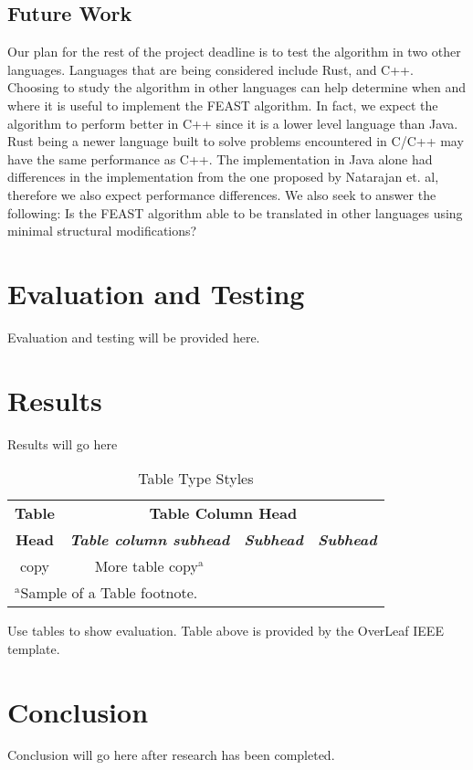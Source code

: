 \documentclass[conference]{IEEEtran}
\begin{document}
\subsection{Future Work}\label{AA}
Our plan for the rest of the project deadline is to test the algorithm in two other languages. Languages that are being considered include Rust, and C++. Choosing to study the algorithm in other languages can help determine when and where it is useful to implement the FEAST algorithm. In fact, we expect the algorithm to perform better in C++ since it is a lower level language than Java. Rust being a newer language built to solve problems encountered in C/C++ may have the same performance as C++. The implementation in Java alone had differences in the implementation from the one proposed by Natarajan et. al, therefore we also expect performance differences. We also seek to answer the following: Is the FEAST algorithm able to be translated in other languages using minimal structural modifications? 

\section{Evaluation and Testing}
Evaluation and testing will be provided here.

\section{Results}
Results will go here

\begin{table}[htbp]
\caption{Table Type Styles}
\begin{center}
\begin{tabular}{|c|c|c|c|}
\hline
\textbf{Table}&\multicolumn{3}{|c|}{\textbf{Table Column Head}} \\
\cline{2-4} 
\textbf{Head} & \textbf{\textit{Table column subhead}}& \textbf{\textit{Subhead}}& \textbf{\textit{Subhead}} \\
\hline
copy& More table copy$^{\mathrm{a}}$& &  \\
\hline
\multicolumn{4}{l}{$^{\mathrm{a}}$Sample of a Table footnote.}
\end{tabular}
\label{tab1}
\end{center}
\end{table}

Use tables to show evaluation. Table above is provided by the OverLeaf IEEE template.

\section{Conclusion}
Conclusion will go here after research has been completed.
\end{document}

